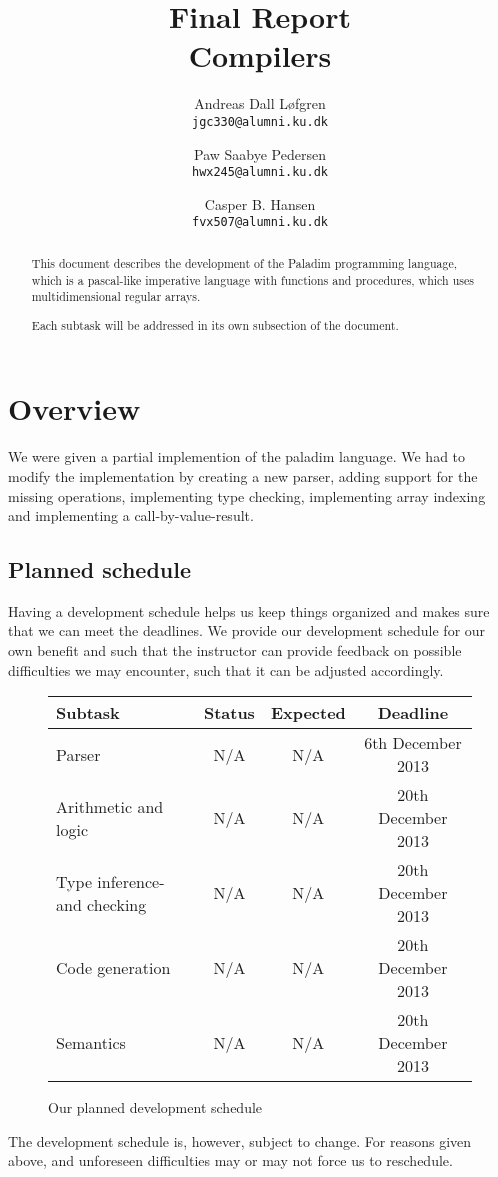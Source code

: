 \documentclass[11pt]{article}
\title%
{%
	{\large Final Report}\\
	Compilers
}
\author%
{%
	Andreas Dall Løfgren\\
	{\tt jgc330@alumni.ku.dk}
	\and
	Paw Saabye Pedersen\\
	{\tt hwx245@alumni.ku.dk}
	\and
	Casper B. Hansen\\
	{\tt fvx507@alumni.ku.dk}
}
\begin{document}
\clearpage
\maketitle
\thispagestyle{empty}
\begin{multicols}{2}
\begin{abstract}
This document describes the development of the Paladim programming language,
which is a pascal-like imperative language with functions and procedures, which
uses multidimensional regular arrays.

Each subtask will be addressed in its own subsection of the document.
\end{abstract}
\vfill
\columnbreak%
\tableofcontents
\end{multicols}

\clearpage
\section{Overview}
We were given a partial implemention of the paladim language. We had to modify the implementation by creating a new parser, adding support for the missing operations, implementing type checking, implementing array indexing and implementing a call-by-value-result.

\subsection{Planned schedule}
Having a development schedule helps us keep things organized and makes sure
that we can meet the deadlines. We provide our development schedule for our
own benefit and such that the instructor can provide feedback on possible
difficulties we may encounter, such that it can be  adjusted accordingly.
\begin{figure}[H]
	\centering
	\begin{tabular}{|l|c|c|c|}
		\hline
		{\bf Subtask} & {\bf Status} & {\bf Expected} & {\bf Deadline} \\ \hline
		Parser & N/A & N/A & 6th December 2013 \\ \hline
		Arithmetic and logic & N/A & N/A & 20th December 2013 \\ \hline
		Type inference- and checking & N/A & N/A & 20th December 2013 \\ \hline
		Code generation & N/A & N/A & 20th December 2013 \\ \hline
		Semantics & N/A & N/A & 20th December 2013 \\ \hline
	\end{tabular}
	\label{table:schedule}
	\caption{Our planned development schedule}
\end{figure}
The development schedule is, however, subject to change. For reasons given
above, and unforeseen difficulties may or may not force us to reschedule.
\end{document}

